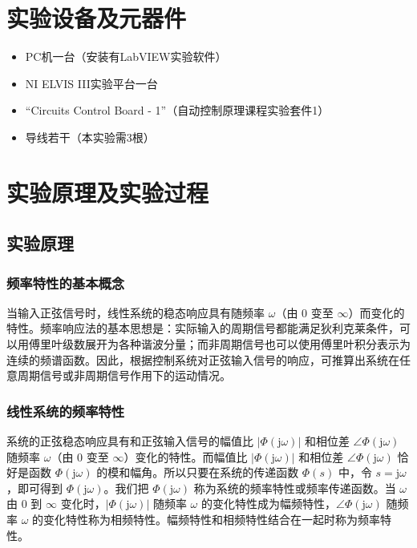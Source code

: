 \documentclass[12pt,a4paper]{article}
\begin{document}
\section{实验设备及元器件}
\begin{itemize}
    \item PC机一台（安装有LabVIEW实验软件）
    \item NI ELVIS III实验平台一台
    \item ``Circuits Control Board - 1''（自动控制原理课程实验套件1）
    \item 导线若干（本实验需3根）
\end{itemize}

\section{实验原理及实验过程}

\subsection{实验原理}

\subsubsection{频率特性的基本概念}
当输入正弦信号时，线性系统的稳态响应具有随频率 $\omega$（由 $0$ 变至 $\infty$）而变化的特性。频率响应法的基本思想是：实际输入的周期信号都能满足狄利克莱条件，可以用傅里叶级数展开为各种谐波分量；而非周期信号也可以使用傅里叶积分表示为连续的频谱函数。因此，根据控制系统对正弦输入信号的响应，可推算出系统在任意周期信号或非周期信号作用下的运动情况。

\subsubsection{线性系统的频率特性}
系统的正弦稳态响应具有和正弦输入信号的幅值比 $|\Phi(\mathrm{j}\omega)|$ 和相位差 $\angle\Phi(\mathrm{j}\omega)$ 随频率 $\omega$（由 $0$ 变至 $\infty$）变化的特性。而幅值比 $|\Phi(\mathrm{j}\omega)|$ 和相位差 $\angle\Phi(\mathrm{j}\omega)$ 恰好是函数 $\Phi(\mathrm{j}\omega)$ 的模和幅角。所以只要在系统的传递函数 $\Phi(s)$ 中，令 $s=\mathrm{j}\omega$，即可得到 $\Phi(\mathrm{j}\omega)$。我们把 $\Phi(\mathrm{j}\omega)$ 称为系统的频率特性或频率传递函数。当 $\omega$ 由 $0$ 到 $\infty$ 变化时，$|\Phi(\mathrm{j}\omega)|$ 随频率 $\omega$ 的变化特性成为幅频特性，$\angle\Phi(\mathrm{j}\omega)$ 随频率 $\omega$ 的变化特性称为相频特性。幅频特性和相频特性结合在一起时称为频率特性。
\end{document}
